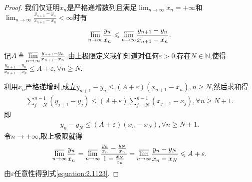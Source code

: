 \documentclass[../../main.tex]{subfiles}%
\begin{document}
\begin{proof}

我们仅证明\(x_n\)是严格递增数列且满足\(\lim_{n \to \infty} x_n = +\infty\)和\(\lim_{n \to \infty} \frac{y_{n + 1} - y_n}{x_{n + 1} - x_n} < \infty\)时有
\begin{align}\label{equation:2.1123}
\underset{n\rightarrow \infty}{{\varlimsup }} \frac{y_n}{x_n} \leqslant \underset{n\rightarrow \infty}{{\varlimsup }} \frac{y_{n + 1} - y_n}{x_{n + 1} - x_n}.
\end{align}

记\(A \triangleq \underset{n\rightarrow \infty}{{\varlimsup }} \frac{y_{n + 1} - y_n}{x_{n + 1} - x_n}\),由上极限定义我们知道对任何\(\varepsilon > 0\),存在\(N \in \mathbb{N}\),使得
\(\frac{y_{n + 1} - y_n}{x_{n + 1} - x_n} \leqslant A + \varepsilon, \forall n \geqslant N\).

利用\(x_n\)严格递增时,成立\(y_{n + 1} - y_n \leqslant (A + \varepsilon)(x_{n + 1} - x_n), n \geqslant N\),然后求和得
\begin{align*}
\sum\limits_{j = N}^{n - 1} (y_{j + 1} - y_j) \leqslant (A + \varepsilon) \sum\limits_{j = N}^{n - 1} (x_{j + 1} - x_j), \forall n \geqslant N + 1.
\end{align*}
即
\begin{align*}
y_n - y_N \leqslant (A + \varepsilon)(x_n - x_N), \forall n \geqslant N + 1.
\end{align*}
令$n\to+\infty$,取上极限就得
\begin{align*}
\underset{n\rightarrow \infty}{{\varlimsup }} \frac{y_n}{x_n} = \underset{n\rightarrow \infty}{{\varlimsup }} \frac{\frac{y_n}{x_n} - \frac{y_N}{x_n}}{1 - \frac{x_N}{x_n}} = \underset{n\rightarrow \infty}{{\varlimsup }} \frac{y_n - y_N}{x_n - x_N} \leqslant A + \varepsilon.
\end{align*}
由\(\varepsilon\)任意性得到式\eqref{equation:2.1123}.

\end{proof}
\end{document}
